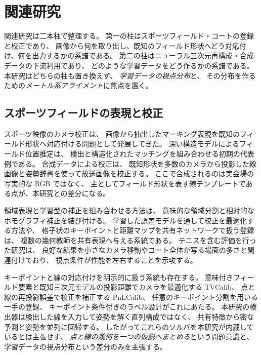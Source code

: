 \section{関連研究}
\label{sec:related_work}

関連研究は二本柱で整理する。
第一の柱はスポーツフィールド・コートの登録と校正であり、
画像から何を取り出し、既知のフィールド形状へどう対応付け、何を出力するかの系譜である。
第二の柱はニューラル三次元再構成・合成データの下流利用であり、
どのような学習データをどう作るかの系譜である。
本研究はどちらの柱も置き換えず、
\emph{学習データの視点分布}と、
その分布を作るための\emph{メートル系アライメント}に焦点を置く。

\subsection{スポーツフィールドの表現と校正}

スポーツ映像のカメラ校正は、
画像から抽出したマーキング表現を既知のフィールド形状へ対応付ける問題として発展してきた。
深い構造モデルによるフィールド位置推定\cite{homayounfar2017sportsfield}は、
検出と構造化されたマッチングを組み合わせる初期の代表例である。
合成データによる校正\cite{chen2019sports}は、
既知形状を多数のカメラから投影した線画像と姿勢辞書を使って放送画像を校正する。
ここで合成されるのは実会場の写実的な RGB ではなく、
主としてフィールド形状を表す線テンプレートである点が、本研究との差分になる。

領域表現と学習型の補正を組み合わせる方法\cite{sha2020endtoend}は、
意味的な領域分割と相対的なホモグラフィ補正を結び付ける。
学習した誤差モデルを通して校正を最適化する方法\cite{jiang2020optimizing}や、
格子状のキーポイントと距離マップを共有ネットワークで扱う登録\cite{nie2021robust}は、
複数の幾何教師を共有表現へ与える系統である。
テニスを含む評価を行った研究\cite{nie2021robust}は、
良好な結果を小さなカメラ移動やコート全体が写る場面の多さと関連付けており、
視点条件が性能を左右することを示唆する。

キーポイントと線の対応付けを明示的に扱う系統も存在する。
意味付きフィールド要素と既知三次元モデルの投影距離でカメラを最適化する TVCalib\cite{theiner2023tvcalib}、
点と線の再投影誤差で校正を補正する PnLCalib\cite{gutierrez2026pnlcalib}、
任意のキーポイント分割を用いる一手の登録\cite{jacquelin2022oneshot}、
キーポイント条件付きのラベル設計\cite{chu2022kpsfr}がこれにあたる。
本研究の検出器は検出した線を入力して姿勢を解く直列構成ではなく、
共有特徴から密な予測と姿勢を並列に回帰する。
したがってこれらのソルバを本研究が内蔵しているとは主張せず、
\emph{点と線の幾何を一つの仮説へまとめる}という問題意識と、
学習データの視点分布という差分のみを主張する。

